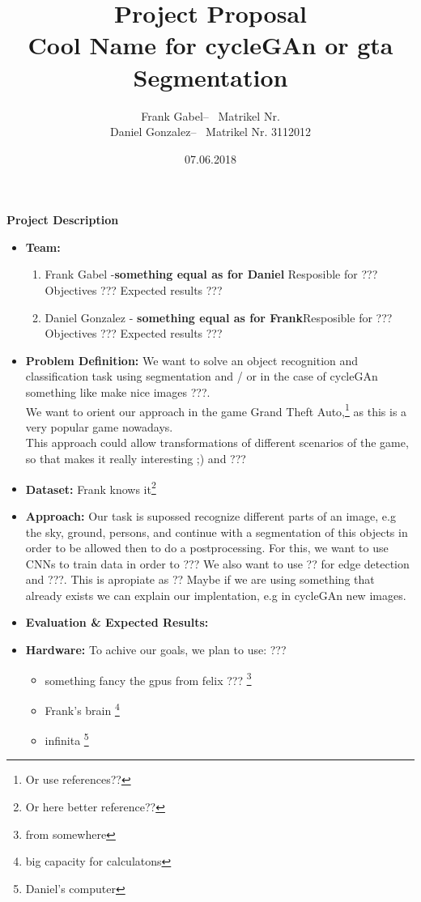 \documentclass[a4paper]{article}
\title{\textbf{Project Proposal}\\ Cool Name for cycleGAn or gta Segmentation}
\author{ 
\begin{tabular}{rl}
Frank Gabel &-- \ Matrikel Nr. \\ 
Daniel Gonzalez &-- \ Matrikel Nr. 3112012
\end{tabular}
}
\date{07.06.2018}
\begin{document}
\maketitle




\vspace{5mm} \noindent \Large \textbf{Project Description} 
\large \newline 

%
\begin{itemize}[leftmargin = 7mm]
\item \textbf{Team:}
\begin{enumerate}
\item Frank Gabel -\textbf{something equal as for Daniel} Resposible for ??? Objectives ??? Expected results ???
\item Daniel Gonzalez - \textbf{something equal as for Frank}Resposible for ??? Objectives ??? Expected results ???
\newline 
\end{enumerate}
%
\item \textbf{Problem Definition:}  We want to solve an object recognition and classification task using segmentation and / or in the case of cycleGAn something like make nice images ???.  \\
We want to orient our approach in the game Grand Theft Auto,\footnote{Or use references??} as this is a very popular game nowadays.\\
This approach could allow transformations of different scenarios of the game, so that makes it really interesting ;) and ???   
%
\\ \item \textbf{Dataset:} Frank knows it\footnote{Or here better reference??}
%
\\ \item \textbf{Approach:} Our task is supossed recognize different parts of an image, e.g the sky, ground, persons, and continue with a segmentation of this objects in order to be allowed then to do a postprocessing.  For this, we want to use CNNs to train data in order to ??? We also want to use ?? for edge detection and ???.   This is apropiate as ?? Maybe if we are using something that already exists we can explain our implentation, e.g in cycleGAn new images.
%
\\ \item \textbf{Evaluation \& Expected Results:}
%
\\ \item \textbf{Hardware:} To achive our goals, we plan to use: ??? 
\begin{itemize} 
\item something fancy the gpus from felix ???  \footnote{from somewhere}
\item Frank's brain \footnote{big capacity for calculatons}
\item infinita \footnote{Daniel's computer}
\end{itemize}
\end{itemize}
\end{document}
